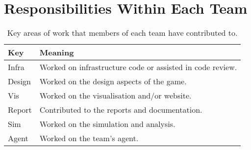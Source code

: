 \section{Responsibilities Within Each Team}
\label{sec:roles_appendix:individual}

\begin{table}[!h]
    \centering
    \begin{tabular}{|l|l|}
    \hline
    \textbf{Key}    & \textbf{Meaning}                               \\ \hline
    Infra  & Worked on infrastructure code or assisted in code review. \\
    Design & Worked on the design aspects of the game.                         \\
    Vis    & Worked on the visualisation and/or website.                      \\
    Report & Contributed to the reports and documentation.                              \\
    Sim    & Worked on the simulation and analysis.                    \\
    Agent  & Worked on the team's agent.                                 \\ \hline
    \end{tabular}
    \caption{Key areas of work that members of each team have contributed to.}
    \label{table:roles_appendix:ind}
    \end{table}






